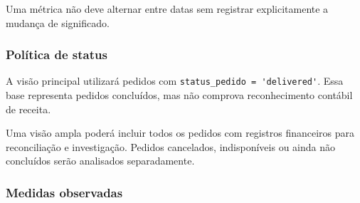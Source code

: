 \documentclass[12pt,a4paper]{article}
\begin{document}
Uma métrica não deve alternar entre datas sem registrar explicitamente a
mudança de significado.

\subsubsection{Política de
status}\label{docs__analytics__contrato_analitico.md__poluxedtica-de-status}

A visão principal utilizará pedidos com
\nolinkurl{status_pedido = 'delivered'}. Essa base representa pedidos
concluídos, mas não comprova reconhecimento contábil de receita.

Uma visão ampla poderá incluir todos os pedidos com registros
financeiros para reconciliação e investigação. Pedidos cancelados,
indisponíveis ou ainda não concluídos serão analisados separadamente.

\subsubsection{Medidas
observadas}\label{docs__analytics__contrato_analitico.md__medidas-observadas}
\end{document}
